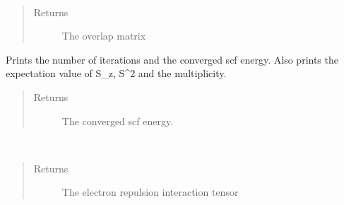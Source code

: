 \documentclass[letterpaper,10pt,english]{sphinxmanual}
\begin{document}
\begin{fulllineitems}
\begin{fulllineitems}
\begin{quote}
\begin{description}
\end{description}\end{quote}

\end{fulllineitems}


\begin{fulllineitems}
\label{\detokenize{UHF:ghf.UHF.UHF.get_ovlp}}~\begin{quote}\begin{description}
\item[{Returns}] \leavevmode
The overlap matrix

\end{description}\end{quote}

\end{fulllineitems}


\begin{fulllineitems}
\label{\detokenize{UHF:ghf.UHF.UHF.get_scf_solution}}
Prints the number of iterations and the converged scf energy.
Also prints the expectation value of S\_z, S\textasciicircum{}2 and the multiplicity.
\begin{quote}\begin{description}
\item[{Returns}] \leavevmode
The converged scf energy.

\end{description}\end{quote}

\end{fulllineitems}


\begin{fulllineitems}
\label{\detokenize{UHF:ghf.UHF.UHF.get_two_e}}~\begin{quote}\begin{description}
\item[{Returns}] \leavevmode
The electron repulsion interaction tensor


\end{description}
\end{quote}
\end{fulllineitems}
\end{fulllineitems}
\end{document}
